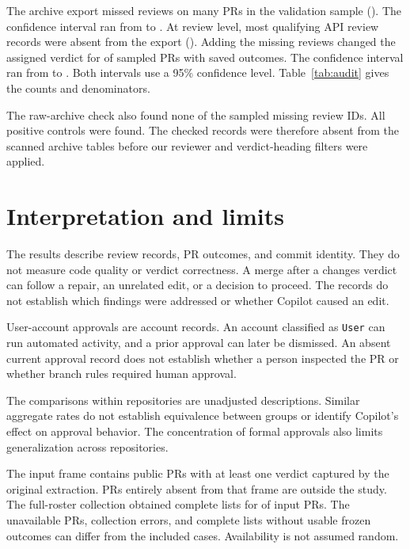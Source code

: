 \documentclass[11pt,letterpaper]{article}
\begin{document}
The archive export missed reviews on many PRs in the validation sample
(\AuditMissingPRRate{}). The confidence interval ran from
\AuditMissingPRLowCI{} to \AuditMissingPRHighCI{}. At review level,
most qualifying API review records were absent from the export
(\AuditMissingReviewRate{}). Adding the missing reviews changed the
assigned verdict for \AuditGroupChangeRate{} of sampled PRs with saved
outcomes. The confidence interval ran from \AuditGroupChangeLowCI{}
to \AuditGroupChangeHighCI{}. Both intervals use a 95\% confidence level.
Table~\ref{tab:audit} gives the counts and denominators.



The raw-archive check also found none of the \ProbeMissingTested{}
sampled missing review IDs. All \ProbeControlsTested{} positive controls
were found. The checked records were therefore absent from the scanned
archive tables before our reviewer and verdict-heading filters were
applied.

\section{Interpretation and limits}

The results describe review records, PR outcomes, and commit identity.
They do not measure code quality or verdict correctness. A merge after a
changes verdict can follow a repair, an unrelated edit, or a decision to
proceed. The records do not establish which findings were addressed or
whether Copilot caused an edit.

User-account approvals are account records. An account classified as
\texttt{User} can run automated activity, and a prior approval can later
be dismissed. An absent current approval record does not establish
whether a person inspected the PR or whether branch rules required
human approval.

The comparisons within repositories are unadjusted descriptions.
Similar aggregate rates do not establish equivalence between groups or
identify Copilot's effect on approval behavior. The concentration of
formal approvals also limits generalization across repositories.

The input frame contains public PRs with at least one verdict
captured by the original extraction. PRs entirely absent from that frame
are outside the study. The full-roster collection obtained complete
lists for \CoverageRate{} of input PRs. The \UnavailableLists{} unavailable PRs, \ErrorLists{} collection
errors, and \MissingStateLists{} complete lists without usable frozen outcomes can differ
from the included cases. Availability is not assumed random.
\end{document}

